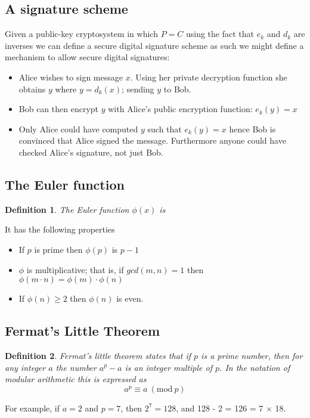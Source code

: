 \documentclass{article}
\theoremstyle{quest}
\newtheorem*{definition}{Definition}
\newcommand{\Mod}[1]{\ (\mathrm{mod}\ #1)}
\begin{document}
\subsection{A signature scheme}
Given a public-key cryptosystem in which $P = C$
using the fact that $e_k$ and $d_k$ are inverses
we can define a secure digital signature scheme as such
we might define a mechanism to allow secure digital signatures:
\begin{itemize}
    \item
        Alice wishes to sign message $x$.
        Using her private decryption function she obtains $y$ where $y = d_k(x)$;
        sending $y$ to Bob.
    \item Bob can then encrypt $y$ with Alice’s public encryption function: $e_k(y) = x$
    \item Only Alice could have computed $y$ such that $e_k(y) = x$ hence Bob is convinced that
    Alice signed the message.
    Furthermore anyone could have checked Alice’s signature, not just Bob.
\end{itemize}

\subsection{The Euler function}
\begin{definition}
    The \textit{Euler function} $\phi(x)$ is
\end{definition}
It has the following properties
\begin{itemize}
    \item If $p$ is prime then $\phi(p)$ is $p - 1$
    \item $\phi$ is multiplicative; that is,
        if $gcd(m,n) = 1$ then $\phi(m \cdot n) = \phi(m) \cdot \phi(n)$
    \item If $\phi(n) \geq 2$ then $\phi(n)$ is even.
\end{itemize}

\subsection{Fermat's Little Theorem}
\begin{definition}
    \textit{Fermat's little theorem} states that if $p$ is a prime number,
    then for any integer $a$ the number $a^p - a$ is an integer multiple of $p$.
    In the notation of modular arithmetic this is expressed as
    $$ a^p \equiv a \Mod p $$
\end{definition}
For example, if $a = 2$ and $p = 7$, then $2^7 = 128$, and 128 - 2 = 126 = 7 $\times$ 18.
\end{document}
